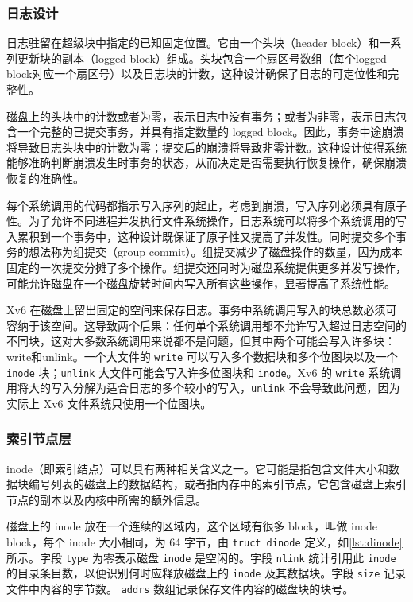 \subsubsection{日志设计}

日志驻留在超级块中指定的已知固定位置。它由一个头块（header block）和一系列更新块的副本（logged block）组成。头块包含一个扇区号数组（每个logged block对应一个扇区号）以及日志块的计数，这种设计确保了日志的可定位性和完整性。

磁盘上的头块中的计数或者为零，表示日志中没有事务；或者为非零，表示日志包含一个完整的已提交事务，并具有指定数量的 logged block。因此，事务中途崩溃将导致日志头块中的计数为零；提交后的崩溃将导致非零计数。这种设计使得系统能够准确判断崩溃发生时事务的状态，从而决定是否需要执行恢复操作，确保崩溃恢复的准确性。

每个系统调用的代码都指示写入序列的起止，考虑到崩溃，写入序列必须具有原子性。为了允许不同进程并发执行文件系统操作，日志系统可以将多个系统调用的写入累积到一个事务中，这种设计既保证了原子性又提高了并发性。同时提交多个事务的想法称为组提交（group commit）。组提交减少了磁盘操作的数量，因为成本固定的一次提交分摊了多个操作。组提交还同时为磁盘系统提供更多并发写操作，可能允许磁盘在一个磁盘旋转时间内写入所有这些操作，显著提高了系统性能。

Xv6 在磁盘上留出固定的空间来保存日志。事务中系统调用写入的块总数必须可容纳于该空间。这导致两个后果：任何单个系统调用都不允许写入超过日志空间的不同块，这对大多数系统调用来说都不是问题，但其中两个可能会写入许多块：write和unlink。一个大文件的 \texttt{write} 可以写入多个数据块和多个位图块以及一个 \texttt{inode} 块；\texttt{unlink} 大文件可能会写入许多位图块和 \texttt{inode}。Xv6 的 \texttt{write} 系统调用将大的写入分解为适合日志的多个较小的写入，\texttt{unlink} 不会导致此问题，因为实际上 Xv6 文件系统只使用一个位图块。

\subsubsection{索引节点层}

inode（即索引结点）可以具有两种相关含义之一。它可能是指包含文件大小和数据块编号列表的磁盘上的数据结构，或者指内存中的索引节点，它包含磁盘上索引节点的副本以及内核中所需的额外信息。

磁盘上的 inode 放在一个连续的区域内，这个区域有很多 block，叫做 inode block，每个 inode 大小相同，为 64 字节，由 \texttt{truct dinode} 定义，如\cref{lst:dinode} 所示。字段 \texttt{type} 为零表示磁盘 \texttt{inode} 是空闲的。字段 \texttt{nlink} 统计引用此 \texttt{inode} 的目录条目数，以便识别何时应释放磁盘上的 \texttt{inode} 及其数据块。字段 \texttt{size} 记录文件中内容的字节数。 \texttt{addrs} 数组记录保存文件内容的磁盘块的块号。



